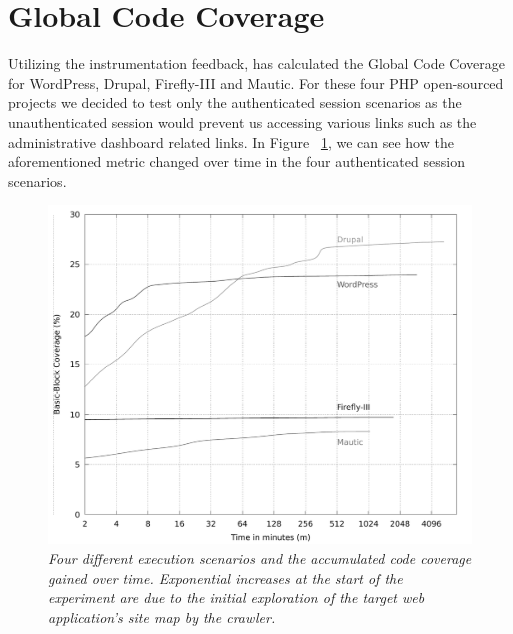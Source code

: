 \section{Global Code Coverage}
Utilizing the instrumentation feedback, \pname{} has calculated the Global Code Coverage for WordPress, Drupal, Firefly-III and Mautic. For these four PHP open-sourced projects we decided to test only the authenticated session scenarios as the unauthenticated session would prevent us accessing various links such as the administrative dashboard related links. In Figure ~\ref{fig:plot_coverage}, we can see how the aforementioned metric changed over time in the four authenticated session scenarios.

\begin{figure}[!htb]
  \centering \includegraphics[width=\linewidth]{figures/plot_coverage.pdf}
  \captionsetup{justification=centering}
  \caption[Accumulated global code coverage using \pname{}]{\textit{Four different execution scenarios and the accumulated code coverage gained over time. Exponential increases at the start of the experiment are due to the initial exploration of the target web application's site map by the crawler.}} 
  \label{fig:plot_coverage}
\end{figure}

